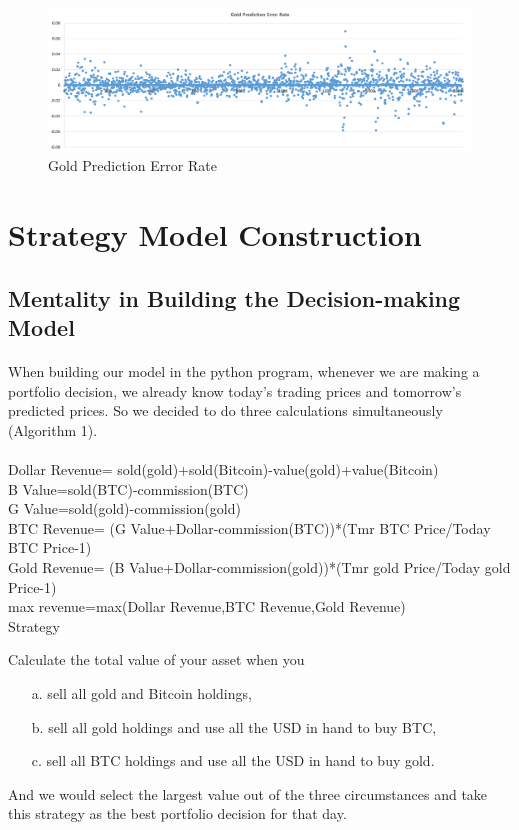 \documentclass[12pt]{article}
\begin{document}
\begin{figure}[htp]
    \centering
    \includegraphics[width=0.8\linewidth]{figures/fig8.png}  
    \caption{Gold Prediction Error Rate}
    \label{fig7:1}
\end{figure}
\newpage
\section{Strategy Model Construction}
\subsection{Mentality in Building the Decision-making Model}
\paragraph{}
When building our model in the python program, whenever we are making a portfolio decision, we already know today's trading prices and tomorrow's predicted prices. So we decided to do three calculations simultaneously (Algorithm 1). 
\paragraph{}
\begin{algorithm}[H]
    Dollar Revenue= sold(gold)+sold(Bitcoin)-value(gold)+value(Bitcoin)\\
    B Value=sold(BTC)-commission(BTC)\\
    G Value=sold(gold)-commission(gold)\\
    BTC Revenue= (G Value+Dollar-commission(BTC))*(Tmr BTC Price/Today BTC Price-1)\\
    Gold Revenue= (B Value+Dollar-commission(gold))*(Tmr gold Price/Today gold Price-1)\\
    max revenue=max(Dollar Revenue,BTC Revenue,Gold Revenue)\\
    \caption{Strategy}
\end{algorithm}
\newpage
Calculate the total value of your asset when you
\begin{itemize}
    \item[a.] sell all gold and Bitcoin holdings,
    \item[b.] sell all gold holdings and use all the USD in hand to buy BTC,
    \item[c.] sell all BTC holdings and use all the USD in hand to buy gold.
\end{itemize}
And we would select the largest value out of the three circumstances and take this strategy as the best portfolio decision for that day.
\end{document}
